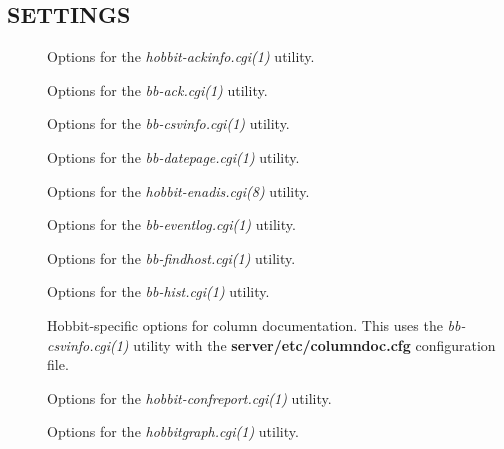 \subsection{SETTINGS}
\begin{description}
\item[] Options for the \emph{hobbit-ackinfo.cgi(1)}
 utility. 

 

\item[] Options for the \emph{bb-ack.cgi(1)}
 utility. 

 

\item[] Options for the \emph{bb-csvinfo.cgi(1)}
 utility. 

 

\item[] Options for the \emph{bb-datepage.cgi(1)}
 utility. 

 

\item[] Options for the \emph{hobbit-enadis.cgi(8)}
 utility. 

 

\item[] Options for the \emph{bb-eventlog.cgi(1)}
 utility. 

 

\item[] Options for the \emph{bb-findhost.cgi(1)}
 utility. 

 

\item[] Options for the \emph{bb-hist.cgi(1)}
 utility. 



\item[] Hobbit-specific options for column documentation. This uses the \emph{bb-csvinfo.cgi(1)}
 utility with the \textbf{server/etc/columndoc.cfg}
 configuration file. 

 

\item[] Options for the \emph{hobbit-confreport.cgi(1)}
 utility. 

 

\item[] Options for the \emph{hobbitgraph.cgi(1)}
 utility. 


\end{description}
